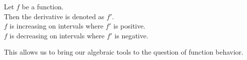\documentclass{ximera}
\begin{document}
\begin{template}

Let $f$ be a function. \\

Then the derivative is denoted as $f'$. \\


$f$ is increasing on intervals where $f'$ is positive. \\


$f$ is decreasing on intervals where $f'$ is negative. \\


\end{template}

This allows us to bring our algebraic tools to the question of function behavior. \\
\end{document}
